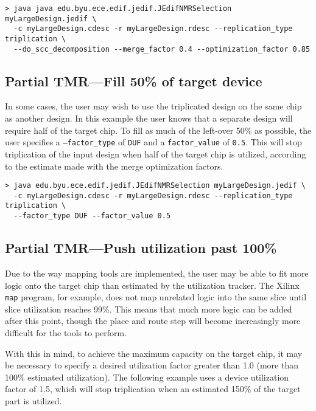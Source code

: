 \begin{verbatim}
> java java edu.byu.ece.edif.jedif.JEdifNMRSelection myLargeDesign.jedif \
  -c myLargeDesign.cdesc -r myLargeDesign.rdesc --replication_type triplication \
  --do_scc_decomposition --merge_factor 0.4 --optimization_factor 0.85
\end{verbatim}

\subsection{Partial TMR---Fill 50\% of target device}
In some cases, the user may wish to use the triplicated design on the same chip 
as another design. In this example the user knows that a separate design will 
require half of the target chip. To fill as much of the left-over 50\% as 
possible, the user specifies a \texttt{--factor\_type} of \texttt{DUF} and a 
\texttt{factor\_value} of \texttt{0.5}. This will stop triplication of the 
input design when half of the target chip is utilized, according to the 
estimate made with the merge optimization factors.

\begin{verbatim}
> java edu.byu.ece.edif.jedif.JEdifNMRSelection myLargeDesign.jedif \
  -c myLargeDesign.cdesc -r myLargeDesign.rdesc --replication_type triplication \
  --factor_type DUF --factor_value 0.5
\end{verbatim}

\subsection{Partial TMR---Push utilization past 100\%}
Due to the way mapping tools are implemented, the user may be able to fit more 
logic onto the target chip than estimated by the utilization tracker. The 
Xilinx \texttt{map} program, for example, does not map unrelated logic into the 
same slice until slice utilization reaches 99\%. This means that much more 
logic can be added after this point, though the place and route step will 
become increasingly more difficult for the tools to perform.

With this in mind, to achieve the maximum capacity on the target chip, it may 
be necessary to specify a desired utilization factor greater than 1.0 (more 
than 100\% estimated utilization). The following example uses a device 
utilization factor of 1.5, which will stop triplication when an estimated 150\% 
of the target part is utilized.

